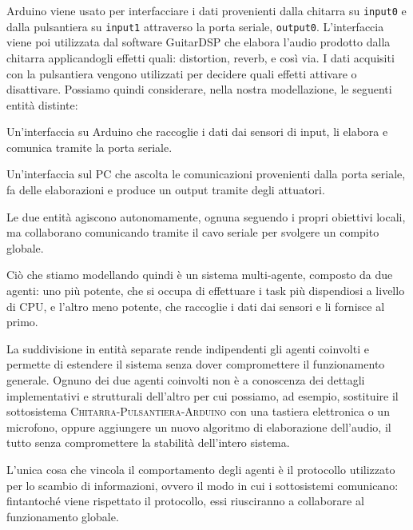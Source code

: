 \documentclass[a4paper,11pt]{article}
\begin{document}
Arduino viene usato per interfacciare i dati provenienti dalla chitarra su \texttt{input0} e dalla pulsantiera su \texttt{input1} attraverso la porta seriale, \texttt{output0}. L'interfaccia viene poi utilizzata dal software GuitarDSP che elabora l'audio prodotto dalla chitarra applicandogli effetti quali: distortion, reverb, e così via. I dati acquisiti con la pulsantiera vengono utilizzati per decidere quali effetti attivare o disattivare. Possiamo quindi considerare, nella nostra modellazione, le seguenti entità distinte:\begin{center}
    \begin{minipage}[t]{0.4\textwidth}
        \begin{tcolorbox}
        Un'interfaccia su Arduino che raccoglie i dati dai sensori di input, li elabora e comunica tramite la porta seriale.
        \end{tcolorbox}
    \end{minipage}
    \begin{minipage}[t]{0.5\textwidth}
        \begin{tcolorbox}
        Un'interfaccia sul PC che ascolta le comunicazioni provenienti dalla porta seriale, fa delle elaborazioni e produce un output tramite degli attuatori.
        \end{tcolorbox}
    \end{minipage}
\end{center}

Le due entità agiscono autonomamente, ognuna seguendo i propri obiettivi locali, ma collaborano comunicando tramite il cavo seriale per svolgere un compito globale.

Ciò che stiamo modellando quindi è un sistema multi-agente, composto da due agenti: uno più potente, che si occupa di effettuare i task più dispendiosi a livello di CPU, e l'altro meno potente, che raccoglie i dati dai sensori e li fornisce al primo.

La suddivisione in entità separate rende indipendenti gli agenti coinvolti e permette di estendere il sistema senza dover compromettere il funzionamento generale. Ognuno dei due agenti coinvolti non è a conoscenza dei dettagli implementativi e strutturali dell'altro per cui possiamo, ad esempio, sostituire il sottosistema \textsc{Chitarra-Pulsantiera-Arduino} con una tastiera elettronica o un microfono, oppure aggiungere un nuovo algoritmo di elaborazione dell'audio, il tutto senza compromettere la stabilità dell'intero sistema.

L'unica cosa che vincola il comportamento degli agenti è il protocollo utilizzato per lo scambio di informazioni, ovvero il modo in cui i sottosistemi comunicano: fintantoché viene rispettato il protocollo, essi riusciranno a collaborare al funzionamento globale.
\end{document}

